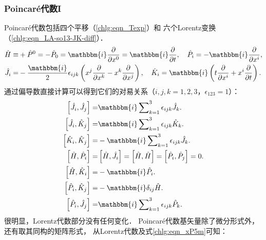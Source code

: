 \subsubsection{Poincar\'{e}代数I}\label{chlg:sec_PA-1}
Poincar\'{e}代数包括四个平移（\eqref{chlg:eqn_Texp}）和
六个Lorentz变换（\eqref{chlg:eqn_LA-so13-JK-diff}）．
\begin{subequations}\label{chlg:eqn_PA-gen}
    \begin{align}
        \hat{H} \equiv& +\hat{P}^0= -\hat{P}_0 = \mathbbm{i}\frac{\partial }{\partial x^0}
        = \mathbbm{i}\frac{\partial }{\partial t }, \quad
        \hat{P}_i = -\mathbbm{i}\frac{\partial }{\partial x^i} ,\\
        \hat{J}_i=& -\frac{\mathbbm{i}}{2}\epsilon_{ijk} \left(x^j\frac{\partial }{\partial x^k}
        - x^k\frac{\partial }{\partial x^j}\right), \quad
        \hat{K}_i= \mathbbm{i} \left(t\frac{\partial }{\partial x^i}+  x^i\frac{\partial }{\partial t}\right) .
    \end{align}
\end{subequations}
通过偏导数直接计算可以得到它们的对易关系（$i,j,k=1,2,3$，$\epsilon_{123}=1$）：
\begin{subequations}\label{chlg:eqn_PA-iso13-comm-PJK}
    \begin{align}
        \left[\hat{J}_i, \hat{J}_j \right] =& \mathbbm{i} \sum\nolimits_{k=1}^{3} \epsilon_{ijk} \hat{J}_k . \\
        \left[\hat{J}_i, \hat{K}_j\right] =& \mathbbm{i} \sum\nolimits_{k=1}^{3} \epsilon_{ijk} \hat{K}_k . \\
        \left[\hat{K}_i, \hat{K}_j\right] =& -\mathbbm{i}\sum\nolimits_{k=1}^{3} \epsilon_{ijk} \hat{J}_k . \\
        \left[\hat{H}, \hat{P}_i \right] =& \left[\hat{H}, \hat{J}_i \right]
        =\left[\hat{H}, \hat{H} \right] =\left[\hat{P}_i, \hat{P}_j \right] =0 . \\
        \left[\hat{H}, \hat{K}_i \right] = & -\mathbbm{i} \hat{P}_i .\\
        \left[\hat{P}_i, \hat{K}_j \right] =& -\mathbbm{i} \delta_{ij} \hat{H} . \\
        \left[\hat{P}_i, \hat{J}_j \right] =& \mathbbm{i} \sum\nolimits_{k=1}^{3} \epsilon_{ijk} \hat{P}_k .
    \end{align}
\end{subequations}
很明显，Lorentz代数部分没有任何变化．
Poincar\'{e}代数基矢量除了微分形式外，还有取其同构的矩阵形式，
从Lorentz代数及式\eqref{chlg:eqn_xP5m}可知：
\setlength{\mathindent}{0em}

